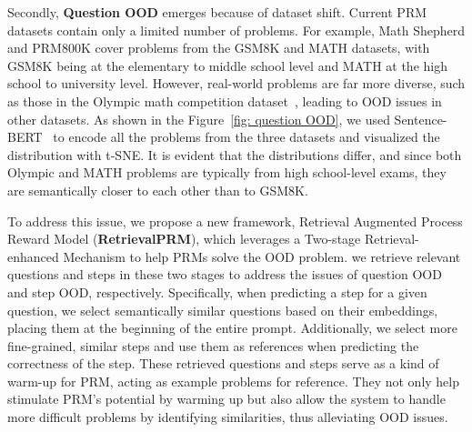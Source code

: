 Secondly, \textbf{Question OOD} emerges because of dataset shift. Current PRM datasets contain only a limited number of problems. For example, Math Shepherd and PRM800K cover problems from the GSM8K and MATH datasets, with GSM8K being at the elementary to middle school level and MATH at the high school to university level. However, real-world problems are far more diverse, such as those in the Olympic math competition dataset~\cite{he2024olympiadbenchchallengingbenchmarkpromoting}, leading to OOD issues in other datasets. As shown in the Figure~\ref{fig: question OOD}, we used Sentence-BERT~\cite{reimers2019sentence} to encode all the problems from the three datasets and visualized the distribution with t-SNE. It is evident that the distributions differ, and since both Olympic and MATH problems are typically from high school-level exams, they are semantically closer to each other than to GSM8K.

To address this issue, we propose a new framework, Retrieval Augmented Process Reward Model (\textbf{RetrievalPRM}), which leverages a Two-stage Retrieval-enhanced Mechanism to help PRMs solve the OOD problem. we retrieve relevant questions and steps in these two stages to address the issues of question OOD and step OOD, respectively. Specifically, when predicting a step for a given question, we select semantically similar questions based on their embeddings, placing them at the beginning of the entire prompt. Additionally, we select more fine-grained, similar steps and use them as references when predicting the correctness of the step. These retrieved questions and steps serve as a kind of warm-up for PRM, acting as example problems for reference. They not only help stimulate PRM’s potential by warming up but also allow the system to handle more difficult problems by identifying similarities, thus alleviating OOD issues. 

